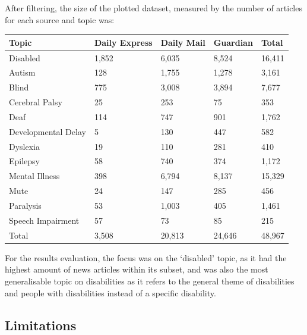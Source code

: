 \documentclass{report}
\begin{document}
After filtering, the size of the plotted dataset, measured by the number of articles for each source and topic was:

\begin{center}
	\begin{tabu} to \textwidth { | X[c] | X[c] | X[c] | X[c] | X[c] | }
		\hline
		Topic & Daily Express & Daily Mail & Guardian & Total \\
		\hline
		Disabled & 1,852 & 6,035 & 8,524 & 16,411  \\
		\hline
		Autism & 128 & 1,755 & 1,278 & 3,161  \\
		\hline
		Blind & 775 & 3,008 & 3,894 & 7,677  \\
		\hline
		Cerebral Palsy & 25 & 253 & 75 & 353  \\
		\hline
		Deaf & 114 & 747 & 901 & 1,762  \\
		\hline
		Developmental Delay & 5 & 130 & 447 & 582  \\
		\hline
		Dyslexia & 19 & 110 & 281 & 410  \\
		\hline
		Epilepsy & 58 & 740 & 374 & 1,172  \\
		\hline
		Mental Illness & 398 & 6,794 & 8,137 & 15,329  \\
		\hline
		Mute & 24 & 147 & 285 & 456  \\
		\hline
		Paralysis & 53 & 1,003 & 405 & 1,461  \\
		\hline
		Speech Impairment & 57 & 73 & 85 & 215  \\
		\hline
		Total & 3,508 & 20,813 & 24,646 & 48,967  \\ 
		\hline
	\end{tabu}
\end{center}

For the results evaluation, the focus was on the `disabled' topic, as it had the highest amount of news articles within its subset, and was also the most generalisable topic on disabilities as it refers to the general theme of disabilities and people with disabilities instead of a specific disability.

\subsection{Limitations} \label{limitations}
\end{document}
